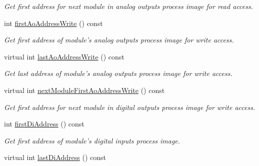 \begin{DoxyCompactItemize}
\begin{DoxyCompactList}\small\item\em Get first address for next module in analog outputs process image for read access. \end{DoxyCompactList}\item 
\hypertarget{classmdt_device_modbus_wago_module_af8b6d9549c820869b09a77ae01e9bf3f}{
int \hyperlink{classmdt_device_modbus_wago_module_af8b6d9549c820869b09a77ae01e9bf3f}{firstAoAddressWrite} () const }
\label{classmdt_device_modbus_wago_module_af8b6d9549c820869b09a77ae01e9bf3f}

\begin{DoxyCompactList}\small\item\em Get first address of module's analog outputs process image for write access. \end{DoxyCompactList}\item 
\hypertarget{classmdt_device_modbus_wago_module_a28f969d1c4fa51a85ee335e44ff012b7}{
virtual int \hyperlink{classmdt_device_modbus_wago_module_a28f969d1c4fa51a85ee335e44ff012b7}{lastAoAddressWrite} () const }
\label{classmdt_device_modbus_wago_module_a28f969d1c4fa51a85ee335e44ff012b7}

\begin{DoxyCompactList}\small\item\em Get last address of module's analog outputs process image for write access. \end{DoxyCompactList}\item 
\hypertarget{classmdt_device_modbus_wago_module_a51b519af4518c16be937fa55b458bf8e}{
virtual int \hyperlink{classmdt_device_modbus_wago_module_a51b519af4518c16be937fa55b458bf8e}{nextModuleFirstAoAddressWrite} () const }
\label{classmdt_device_modbus_wago_module_a51b519af4518c16be937fa55b458bf8e}

\begin{DoxyCompactList}\small\item\em Get first address for next module in digital outputs process image for write access. \end{DoxyCompactList}\item 
\hypertarget{classmdt_device_modbus_wago_module_a2229734519a6168e459115a87c7caa5c}{
int \hyperlink{classmdt_device_modbus_wago_module_a2229734519a6168e459115a87c7caa5c}{firstDiAddress} () const }
\label{classmdt_device_modbus_wago_module_a2229734519a6168e459115a87c7caa5c}

\begin{DoxyCompactList}\small\item\em Get first address of module's digital inputs process image. \end{DoxyCompactList}\item 
\hypertarget{classmdt_device_modbus_wago_module_af39bda468cf9fa967aaa5c052ae14d81}{
virtual int \hyperlink{classmdt_device_modbus_wago_module_af39bda468cf9fa967aaa5c052ae14d81}{lastDiAddress} () const }
\label{classmdt_device_modbus_wago_module_af39bda468cf9fa967aaa5c052ae14d81}


\end{DoxyCompactItemize}
